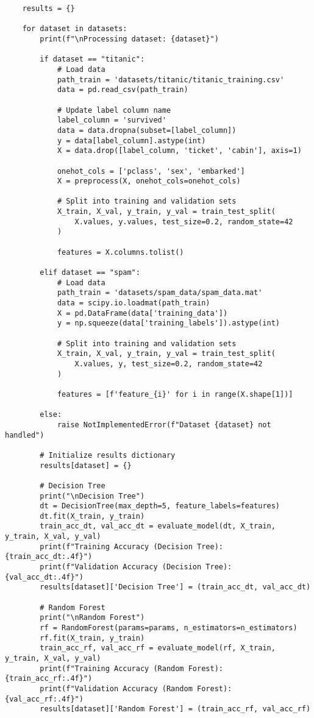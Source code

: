 \documentclass{article}
\begin{document}
\begin{enumerate}
\begin{verbatim}
    results = {}

    for dataset in datasets:
        print(f"\nProcessing dataset: {dataset}")

        if dataset == "titanic":
            # Load data
            path_train = 'datasets/titanic/titanic_training.csv'
            data = pd.read_csv(path_train)

            # Update label column name
            label_column = 'survived'
            data = data.dropna(subset=[label_column])
            y = data[label_column].astype(int)
            X = data.drop([label_column, 'ticket', 'cabin'], axis=1)

            onehot_cols = ['pclass', 'sex', 'embarked']
            X = preprocess(X, onehot_cols=onehot_cols)

            # Split into training and validation sets
            X_train, X_val, y_train, y_val = train_test_split(
                X.values, y.values, test_size=0.2, random_state=42
            )

            features = X.columns.tolist()

        elif dataset == "spam":
            # Load data
            path_train = 'datasets/spam_data/spam_data.mat'
            data = scipy.io.loadmat(path_train)
            X = pd.DataFrame(data['training_data'])
            y = np.squeeze(data['training_labels']).astype(int)

            # Split into training and validation sets
            X_train, X_val, y_train, y_val = train_test_split(
                X.values, y, test_size=0.2, random_state=42
            )

            features = [f'feature_{i}' for i in range(X.shape[1])]

        else:
            raise NotImplementedError(f"Dataset {dataset} not handled")

        # Initialize results dictionary
        results[dataset] = {}

        # Decision Tree
        print("\nDecision Tree")
        dt = DecisionTree(max_depth=5, feature_labels=features)
        dt.fit(X_train, y_train)
        train_acc_dt, val_acc_dt = evaluate_model(dt, X_train, y_train, X_val, y_val)
        print(f"Training Accuracy (Decision Tree): {train_acc_dt:.4f}")
        print(f"Validation Accuracy (Decision Tree): {val_acc_dt:.4f}")
        results[dataset]['Decision Tree'] = (train_acc_dt, val_acc_dt)

        # Random Forest
        print("\nRandom Forest")
        rf = RandomForest(params=params, n_estimators=n_estimators)
        rf.fit(X_train, y_train)
        train_acc_rf, val_acc_rf = evaluate_model(rf, X_train, y_train, X_val, y_val)
        print(f"Training Accuracy (Random Forest): {train_acc_rf:.4f}")
        print(f"Validation Accuracy (Random Forest): {val_acc_rf:.4f}")
        results[dataset]['Random Forest'] = (train_acc_rf, val_acc_rf)


\end{verbatim}
\end{enumerate}
\end{document}
